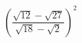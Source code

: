 \begin{ex}[type=calculate]
	\begin{condition}
		\( \left( \dfrac{\sqrt{12}-\sqrt{27}}{\sqrt{18}-\sqrt{2}} \right)^2 \)
	\end{condition}
\end{ex}